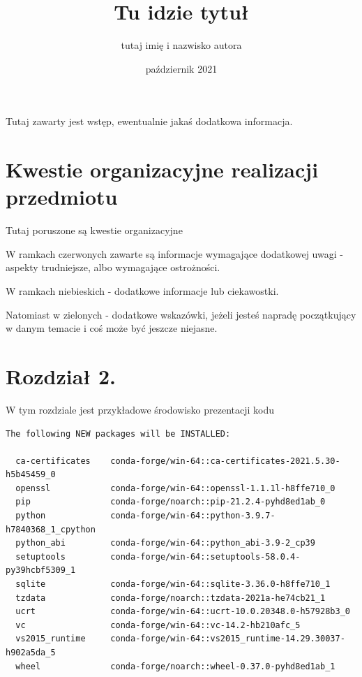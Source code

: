 \documentclass[a4paper]{article}
\title{Tu idzie tytuł}
\author{tutaj imię i nazwisko autora}
\date{\footnotesize październik 2021}
\begin{document}
\maketitle


\begin{info}
\footnotesize Tutaj zawarty jest wstęp, ewentualnie jakaś dodatkowa informacja.
\end{info}

\tableofcontents

\newpage
\section{Kwestie organizacyjne realizacji przedmiotu}
Tutaj poruszone są kwestie organizacyjne

\begin{warning}
 W ramkach czerwonych zawarte są informacje wymagające dodatkowej uwagi - aspekty trudniejsze, albo wymagające ostrożności.
\end{warning}

\begin{tip}
 W ramkach niebieskich - dodatkowe informacje lub ciekawostki.
\end{tip}

\begin{expl}
 Natomiast w zielonych - dodatkowe wskazówki, jeżeli jesteś napradę początkujący w danym temacie i coś może być jeszcze niejasne.

\end{expl}

\newpage
\section{Rozdział 2.}
W tym rozdziale jest przykładowe środowisko prezentacji kodu

\begin{verbatim}
The following NEW packages will be INSTALLED:

  ca-certificates    conda-forge/win-64::ca-certificates-2021.5.30-h5b45459_0
  openssl            conda-forge/win-64::openssl-1.1.1l-h8ffe710_0
  pip                conda-forge/noarch::pip-21.2.4-pyhd8ed1ab_0
  python             conda-forge/win-64::python-3.9.7-h7840368_1_cpython
  python_abi         conda-forge/win-64::python_abi-3.9-2_cp39
  setuptools         conda-forge/win-64::setuptools-58.0.4-py39hcbf5309_1
  sqlite             conda-forge/win-64::sqlite-3.36.0-h8ffe710_1
  tzdata             conda-forge/noarch::tzdata-2021a-he74cb21_1
  ucrt               conda-forge/win-64::ucrt-10.0.20348.0-h57928b3_0
  vc                 conda-forge/win-64::vc-14.2-hb210afc_5
  vs2015_runtime     conda-forge/win-64::vs2015_runtime-14.29.30037-h902a5da_5
  wheel              conda-forge/noarch::wheel-0.37.0-pyhd8ed1ab_1

\end{verbatim}
\end{document}
